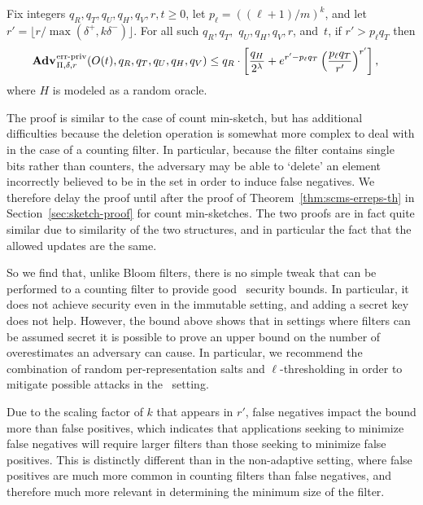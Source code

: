 \begin{theorem}\label{thm:counting-erreps}
Fix integers $q_R,q_T,q_U,q_H,q_V, r, t \geq 0$, let $p_\ell = ((\ell+1)/m)^k$,
and let
$r' = \lfloor r/\max(\delta^+,k\delta^-) \rfloor$. For all such
$q_R,q_T,$ $q_U,q_H,q_V,r$, and~$t$, if $r' > p_\ell q_T$ then
  \begin{equation*}
  \begin{aligned}
   \Adv{\erreps}_{\Pi,\delta,r}(O(t),\,&q_R,q_T,q_U,q_H,q_V) \leq q_R \cdot \left[\frac{q_H}{2^\lambda} + e^{r'-p_\ell q_T}\left(\frac{p_\ell q_T}{r'}\right)^{r'}\right],
  \end{aligned}
\end{equation*}
where $H$ is modeled as a random oracle.
\end{theorem}
The proof is similar to the case of count min-sketch, but has additional
difficulties because the deletion operation is somewhat more complex to deal
with in the case of a counting filter. In particular, because the filter contains
single bits rather than counters, the adversary may be able
to `delete' an element incorrectly believed to be in the set in order to induce
false negatives. We therefore delay the proof until after the proof
of Theorem~\ref{thm:scms-erreps-th} in Section~\ref{sec:sketch-proof} for count min-sketches. The two proofs are
in fact quite similar due to similarity of the two structures, and in particular
the fact that the allowed updates are the same.

So we find that, unlike Bloom filters, there is no simple tweak that can be performed
to a counting filter to provide good \errep\ security bounds. In particular, it
does not achieve security even in the immutable setting, and adding a secret key
does not help.
%
However, the bound above shows that in settings where filters can be assumed
secret it is possible to prove an upper bound on the number of overestimates an
adversary can cause. In particular, we recommend the combination of random
per-representation salts and $\ell$-thresholding in order to mitigate possible
attacks in the \erreps\ setting.

Due to the scaling factor of $k$ that appears in $r'$,
false negatives impact the bound more
than false positives,
which indicates that applications seeking to minimize false negatives will
require larger filters than those seeking to minimize false positives. This is
distinctly different than in the non-adaptive setting, where false positives are
much more common in counting filters than false negatives, and therefore much
more relevant in determining the minimum size of the filter.
